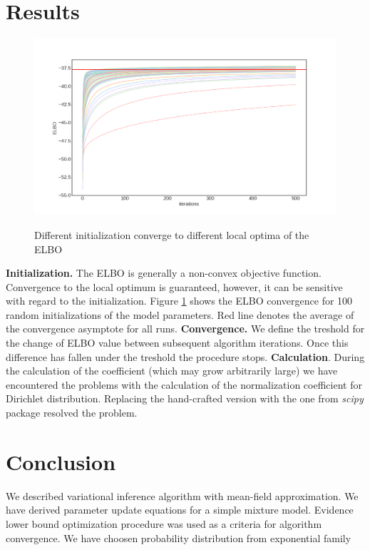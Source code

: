 \documentclass{article}
\begin{document}
\section{Results}
\begin{figure}[H]
\includegraphics[width=\textwidth]{ELBO_Convergence}\label{elbo:conv}
\caption{Different initialization converge to different local optima of the ELBO}
\end{figure}
\textbf{Initialization.} The ELBO is generally a non-convex objective function. Convergence to the local optimum is guaranteed, however, it can be sensitive with regard to the initialization. Figure \ref{elbo:conv} shows the ELBO convergence for 100 random initializations of the model parameters. Red line denotes the average of the convergence asymptote for all runs. 
\textbf{Convergence.} We define the treshold for the change of ELBO value between subsequent algorithm iterations. Once this difference has fallen under the treshold the procedure stops.
\textbf{Calculation}. During the calculation of the coefficient (which may grow arbitrarily large) we have encountered the problems with the calculation of the normalization coefficient for Dirichlet distribution. Replacing the hand-crafted version with the one from \textit{scipy} package resolved the problem.
\section{Conclusion}
We described variational inference algorithm with mean-field approximation. We have derived parameter update equations for a simple mixture model. Evidence lower bound optimization procedure was used as a criteria for algorithm convergence. We have choosen probability distribution from exponential family 
\end{document}
